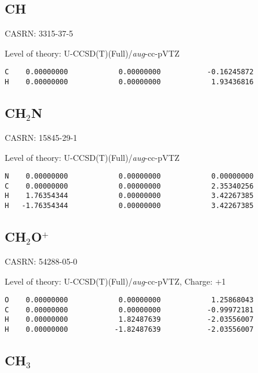 \documentclass[journal=jctcce,manuscript=article,layout=traditional]{achemso}
\newcommand{\AVTZ}{\emph{aug}-cc-pVTZ}
\begin{document}
\subsection{CH}

CASRN: 3315-37-5

\begin{singlespace}
\noindent Level of theory: U-CCSD(T)(Full)/{\AVTZ}
\begin{verbatim}
C    0.00000000            0.00000000           -0.16245872
H    0.00000000            0.00000000            1.93436816
\end{verbatim}
\end{singlespace}

\subsection{CH$_2$N}

CASRN: 15845-29-1

\begin{singlespace}
\noindent Level of theory: U-CCSD(T)(Full)/{\AVTZ}
\begin{verbatim}
N    0.00000000            0.00000000            0.00000000
C    0.00000000            0.00000000            2.35340256
H    1.76354344            0.00000000            3.42267385
H   -1.76354344            0.00000000            3.42267385
\end{verbatim}
\end{singlespace}

\subsection{CH$_2$O$^+$}

CASRN: 54288-05-0

\begin{singlespace}
\noindent Level of theory: U-CCSD(T)(Full)/{\AVTZ}, Charge: +1
\begin{verbatim}
O    0.00000000            0.00000000            1.25868043
C    0.00000000            0.00000000           -0.99972181
H    0.00000000            1.82487639           -2.03556007
H    0.00000000           -1.82487639           -2.03556007
\end{verbatim}
\end{singlespace}

\subsection{CH$_3$}
\end{document}
